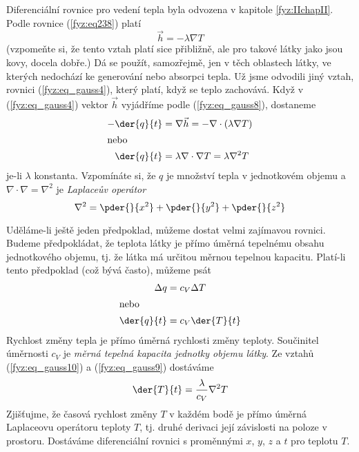       Diferenciální rovnice pro vedení tepla byla odvozena v kapitole 
      \ref{fyz:IIchapII}. Podle rovnice (\ref{fyz:eq238}) platí
      \begin{equation}\label{fyz:eq_gauss8}
      \vec{h}=-\lambda\nabla T
      \end{equation}    
      (vzpomeňte si, že tento vztah platí sice přibližně, ale pro takové látky jako jsou kovy, 
      docela dobře.) Dá se použít, samozřejmě, jen v těch oblastech látky, ve kterých nedochází ke 
      generování nebo absorpci tepla. Už jsme odvodili jiný vztah, rovnici (\ref{fyz:eq_gauss4}), 
      který platí, když se teplo zachovává. Když v (\ref{fyz:eq_gauss4}) vektor \(\vec{h}\) 
      vyjádříme podle (\ref{fyz:eq_gauss8}), dostaneme
      \begin{align}
        - \der{q}{t} &= \nabla\vec{h} = - \nabla\cdot(\lambda\nabla T)     \nonumber    \\ 
        \intertext{nebo}
          \der{q}{t} &= \lambda\nabla\cdot\nabla T = \lambda\nabla^2 T     \label{fyz:eq_gauss9}
      \end{align}
      je-li \(\lambda\) konstanta. Vzpomínáte si, že \(q\) je množství tepla v jednotkovém objemu a
      \(\nabla\cdot\nabla = \nabla^2\) je \emph{Laplaceův operátor}
      \begin{equation*}
        \nabla^2= \pder{ }{x^2} + \pder{ }{y^2} + \pder{ }{z^2}
      \end{equation*}       
    
      Uděláme-li ještě jeden předpoklad, můžeme dostat velmi zajímavou rovnici. Budeme 
      předpokládat, že teplota látky je přímo úměrná tepelnému obsahu jednotkového objemu, tj. že 
      látka má určitou  měrnou tepelnou kapacitu. Platí-li tento předpoklad (což bývá často), 
      můžeme psát
      \begin{align}
         \Delta q   &= c_V\Delta T                                        \nonumber    \\ 
       \intertext{nebo}
         \der{q}{t} &= c_V\der{T}{t}                                      \label{fyz:eq_gauss10}
      \end{align}    
      Rychlost změny tepla je přímo úměrná rychlosti změny teploty. Součinitel úměrnosti \(c_V\) je 
      \emph{měrná tepelná kapacita jednotky objemu látky}. Ze vztahů (\ref{fyz:eq_gauss10}) a 
      (\ref{fyz:eq_gauss9}) 
      dostáváme
      \begin{equation}\label{fyz:eq_gauss11}
       \der{T}{t} = \frac{\lambda}{c_V}\nabla^2T
      \end{equation}
      Zjišťujme, že časová rychlost změny \(T\) v každém bodě je přímo úměrná Laplaceovu operátoru 
      teploty \(T\), tj. druhé derivaci její závislosti na poloze v prostoru. Dostáváme 
      diferenciální rovnici s proměnnými \(x\), \(y\), \(z\) a \(t\) pro teplotu \(T\).
      
